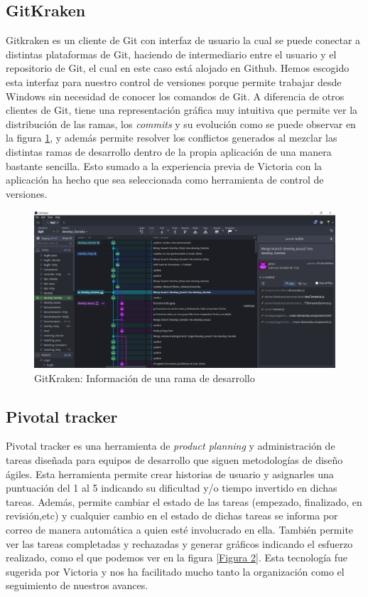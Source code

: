 \documentclass[11pt]{article}
\begin{document}
	\subsection{GitKraken}
 Gitkraken es un cliente de Git con interfaz de usuario la cual se puede conectar a distintas plataformas de Git, haciendo de intermediario entre el usuario y el repositorio de Git, el cual en este caso está alojado en Github. Hemos escogido esta interfaz para nuestro control de versiones porque permite trabajar desde Windows sin necesidad de conocer los comandos de Git. A diferencia de otros clientes de Git, tiene una representación gráfica muy intuitiva que permite ver la distribución de las ramas, los \emph{commits} y su evolución como se puede observar en la figura \ref{Figura 1}, y además permite resolver los conflictos generados al mezclar las distintas ramas de desarrollo dentro de la propia aplicación de una manera bastante sencilla. Esto sumado a la experiencia previa de Victoria con la aplicación ha hecho que sea seleccionada como herramienta de control de versiones.
	\begin{figure}
		\centering
		\includegraphics[scale=0.4]{gitkraken}
		\caption{GitKraken: Información de una rama de desarrollo}
		\label{Figura 1}
	\end{figure}
	
	\subsection{Pivotal tracker}
Pivotal tracker es una herramienta de \emph{product planning} y administración de tareas diseñada para equipos de desarrollo que siguen metodologías de diseño ágiles.
	Esta herramienta permite crear historias de usuario y asignarles una puntuación del 1 al 5 indicando su dificultad y/o tiempo invertido en dichas tareas. Además, permite cambiar el estado de las tareas (empezado, finalizado, en revisión,etc) y cualquier cambio en el estado de dichas tareas se informa por correo de manera automática a quien esté involucrado en ella.
	También permite ver las tareas completadas y rechazadas y generar gráficos indicando el esfuerzo realizado, como el que podemos ver en la figura \ref{Figura 2}. Esta tecnología fue sugerida por Victoria y nos ha facilitado mucho tanto la organización como el seguimiento de nuestros avances.
	
\end{document}
